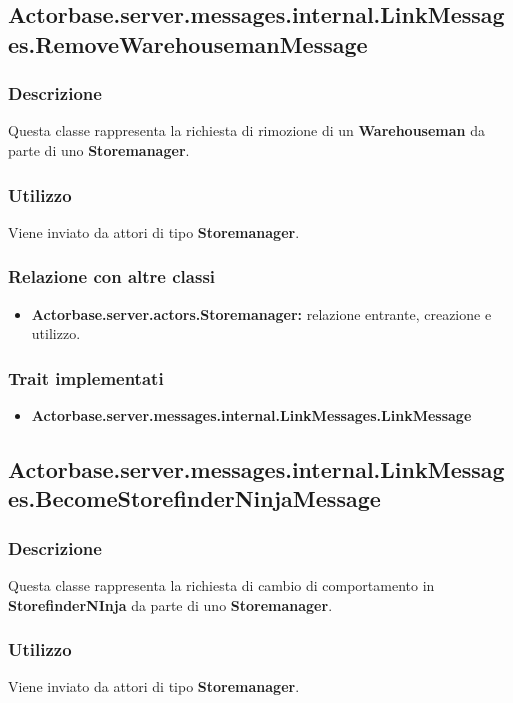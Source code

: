 \documentclass[a4paper]{article}
\begin{document}
		\subsection{Actorbase.server.messages.internal.LinkMessages.RemoveWarehousemanMessage}
			\subsubsection{Descrizione}
				Questa classe rappresenta la richiesta di rimozione di un \textbf{Warehouseman} da 
				parte di uno \textbf{Storemanager}.
				
			\subsubsection{Utilizzo}
				Viene inviato da attori di tipo \textbf{Storemanager}.
				
			\subsubsection{Relazione con altre classi}
				\begin{itemize}
					\item \textbf{Actorbase.server.actors.Storemanager:} relazione entrante, creazione e utilizzo.
				\end{itemize}
				
			\subsubsection{Trait implementati}
				\begin{itemize}
					\item \textbf{Actorbase.server.messages.internal.LinkMessages.LinkMessage} 
				\end{itemize}
				
				
	\subsection{Actorbase.server.messages.internal.LinkMessages.BecomeStorefinderNinjaMessage}
			\subsubsection{Descrizione}
				Questa classe rappresenta la richiesta di cambio di comportamento in \textbf{StorefinderNInja} da 
				parte di uno \textbf{Storemanager}.
				
			\subsubsection{Utilizzo}
				Viene inviato da attori di tipo \textbf{Storemanager}.
				
\end{document}
